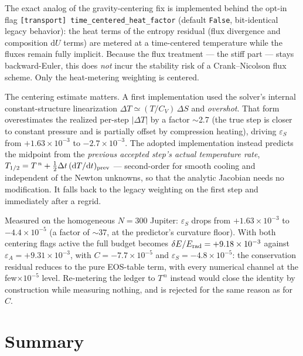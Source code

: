 \documentclass{aastex631}
\newcommand{\dd}{\mathrm{d}}
\newcommand{\Erad}{E_{\rm rad}}
\newcommand{\epsA}{\varepsilon_A}
\newcommand{\epsS}{\varepsilon_S}
\newcommand{\dE}{\delta E}
\begin{document}
The exact analog of the gravity-centering fix is implemented behind the
opt-in flag \texttt{[transport] time\_centered\_heat\_factor} (default
\texttt{False}, bit-identical legacy behavior): the heat terms of the
entropy residual (flux divergence and composition $\dd U$ terms) are
metered at a time-centered temperature while the fluxes remain fully
implicit.  Because the flux treatment --- the stiff part --- stays
backward-Euler, this does \emph{not} incur the stability risk of a
Crank--Nicolson flux scheme.  Only the heat-metering weighting is
centered.

The centering estimate matters.  A first implementation used the
solver's internal constant-structure linearization
$\Delta T \simeq (T/C_V)\,\Delta S$ and \emph{overshot}.  That form
overestimates the realized per-step $|\Delta T|$ by a factor
$\sim$2.7 (the true step is closer to constant pressure and is partially
offset by compression heating), driving $\epsS$ from
$+1.63\times10^{-3}$ to $-2.7\times10^{-3}$.  The adopted
implementation instead predicts the midpoint from the \emph{previous
accepted step's actual temperature rate},
$T_{1/2} = T^{\,n} + \tfrac{1}{2}\Delta t\,(\dd T/\dd t)_{\rm prev}$ ---
second-order for smooth cooling and independent of the Newton unknowns,
so that the analytic Jacobian needs no modification.  It falls back to
the legacy weighting on the first step and immediately after a regrid.

Measured on the homogeneous $N=300$ Jupiter: $\epsS$ drops from
$+1.63\times10^{-3}$ to $-4.4\times10^{-5}$ (a factor of $\sim$37, at
the predictor's curvature floor).  With both centering flags active the
full budget becomes
$\dE/\Erad = +9.18\times10^{-3}$ against $\epsA = +9.31\times10^{-3}$,
with $C = -7.7\times10^{-5}$ and $\epsS = -4.8\times10^{-5}$: the
conservation residual reduces to the pure EOS-table term, with every
numerical channel at the few$\times10^{-5}$ level.  Re-metering the
ledger to $T^{\,n}$ instead would close the identity by construction
while measuring nothing, and is rejected for the same reason as for
$C$.

\section{Summary}
\end{document}
